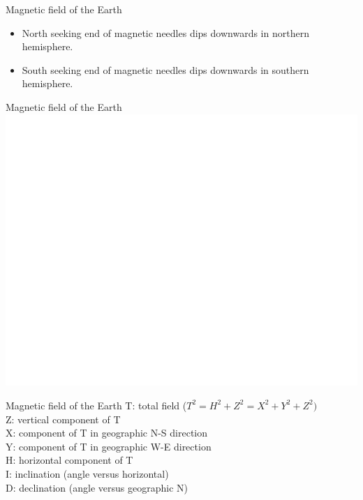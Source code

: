     \begin{frame}
    \begin{PointSix}{Magnetic field of the Earth}
      \begin{itemize}
        \item North seeking end of magnetic needles dips downwards in northern hemisphere.
        \item South seeking end of magnetic needles dips downwards in southern hemisphere.
      \end{itemize}
    \end{PointSix}
    \end{frame}

    \begin{frame}
      \begin{PointSix}{Magnetic field of the Earth}
        \includegraphics[width=0.99\linewidth]{Figures/Magnetics/Coordinates.png}
      \end{PointSix}
    \end{frame}

    \begin{frame}
      \begin{PointSix}{Magnetic field of the Earth}
        \small
          T: total field ($T^2=H^2+Z^2=X^2+Y^2+Z^2)$ \\
          Z: vertical component of T \\
          X: component of T in geographic N-S direction \\
          Y: component of T in geographic W-E direction \\
          H: horizontal component of T \\
          I: inclination (angle versus horizontal) \\
          D: declination (angle versus geographic N) \\
      \end{PointSix}
    \end{frame}

